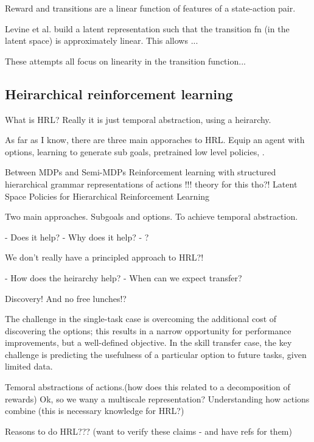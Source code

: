 \cite{Wang} Reward and transitions are a linear function of features of a state-action pair.

Levine et al. \cite{Levine2019} build a latent representation such that the transition fn (in the latent space) is approximately linear. This allows ...

These attempts all focus on linearity in the transition function...

\subsection{Heirarchical reinforcement learning}

What is HRL? Really it is just temporal abstraction, using a heirarchy.

As far as I know, there are three main apporaches to HRL.
Equip an agent with options, learning to generate sub goals, pretrained low level policies, .


Between MDPs and Semi-MDPs \cite{RichardS.SuttonaDoinaPrecupb1998}
Reinforcement learning with structured hierarchical grammar representations of actions  \cite{Christodoulou2019}  !!! theory for this tho?!
Latent Space Policies for Hierarchical Reinforcement Learning \cite{Haarnoja}

Two main approaches. Subgoals and options. To achieve temporal abstraction.

- Does it help?
- Why does it help?
- ?

We don't really have a principled approach to HRL?!

- How does the heirarchy help?
- When can we expect transfer?

Discovery! And no free lunches!?

\begin{displayquote}
  The challenge in the single-task case is overcoming the additional cost of discovering the options; this results in a narrow opportunity for performance improvements, but a well-defined objective. In the skill transfer case, the key challenge is predicting the usefulness of a particular option to future tasks, given limited data. \cite{Konidaris2019}
\end{displayquote}


Temoral abstractions of actions.(how does this related to a
decomposition of rewards) Ok, so we wany a multiscale representation?
Understanding how actions combine (this is necessary knowledge for HRL?)

Reasons to do HRL??? (want to verify these claims - and have refs for
them)


